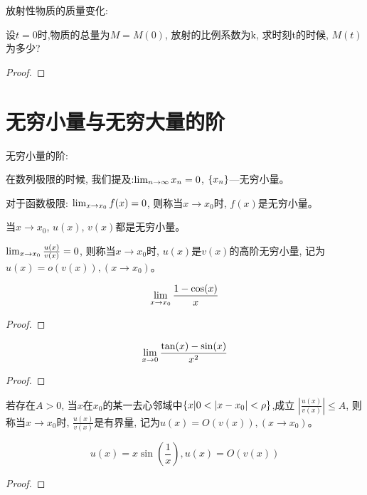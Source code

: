 \begin{proposition}
    放射性物质的质量变化:

    设$t = 0$时,物质的总量为$M = M(0)$, 放射的比例系数为k, 求时刻t的时候, $M(t)$为多少?
\end{proposition}
\begin{proof}
    
\end{proof}

\section{无穷小量与无穷大量的阶}
无穷小量的阶:

在数列极限的时候, 我们提及:$\lim_{n \to \infty } x_n = 0$, $\left\{ x_n\right\}$---无穷小量。

对于函数极限:
$\lim_{x \to x_0 } f(x) = 0$, 则称当$x \to x_0$时, $f(x)$是无穷小量。

当$x \to x_0$, $u(x)$, $v(x)$都是无穷小量。

\begin{definition}
    $\lim_{x \to x_0 } \frac{u(x)}{v(x)} = 0$, 则称当$x \to x_0$时, $u(x)$是$v(x)$的高阶无穷小量, 记为$u(x) = o(v(x)), (x \to x_0)$。    
\end{definition}

\begin{proposition}
    \[ \lim_{x \to x_0 } \frac{1-\cos(x)}{x}\] 
\end{proposition}
\begin{proof}
    
\end{proof}

\begin{proposition}
    \[ \lim_{x \to 0 } \frac{\tan(x) - \sin(x)}{x^2} \]
\end{proposition}
\begin{proof}
    
\end{proof}
\begin{definition}
    若存在$A > 0$, 当$x$在$x_0$的某一去心邻域中$\left\{ x|  0 < \left| x - x_0\right| < \rho\right\}$,成立 $\left| \frac{u(x)}{v(x)} \right| \le A$, 则称当$x \to x_0$时, $\frac{u(x)}{v(x)}$是有界量, 记为$u(x) = O(v(x)), (x \to x_0)$。    
\end{definition}

\begin{proposition}
    \[u(x) = x\sin\left(\frac{1}{x}\right), u(x) = O(v(x))\]
\end{proposition}
\begin{proof}
    
\end{proof}

